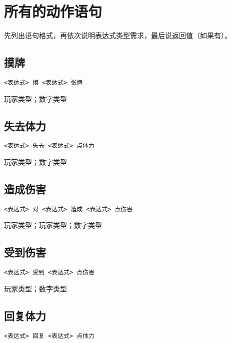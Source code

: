 \chapter{所有的动作语句}

先列出语句格式，再依次说明表达式类型需求，最后说返回值（如果有）。

\section{摸牌}

\begin{verbatim}
<表达式> 摸 <表达式> 张牌
\end{verbatim}

玩家类型；数字类型

\section{失去体力}

\begin{verbatim}
<表达式> 失去 <表达式> 点体力
\end{verbatim}

玩家类型；数字类型

\section{造成伤害}

\begin{verbatim}
<表达式> 对 <表达式> 造成 <表达式> 点伤害
\end{verbatim}

玩家类型；玩家类型；数字类型

\section{受到伤害}

\begin{verbatim}
<表达式> 受到 <表达式> 点伤害
\end{verbatim}

玩家类型；数字类型

\section{回复体力}

\begin{verbatim}
<表达式> 回复 <表达式> 点体力
\end{verbatim}

